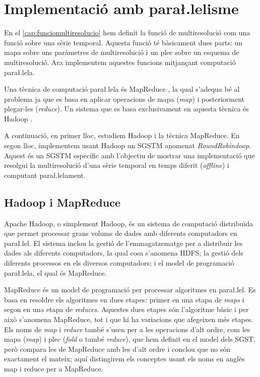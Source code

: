 \chapter{Implementació amb para\l.lelisme}
\label{sec:implementacio:mapreduce}



En el \autoref{cap:funciomultiresolucio} hem definit la funció de
multiresolució com una funció sobre una sèrie temporal. Aquesta funció
té bàsicament dues parts: un mapa sobre uns paràmetres de
multiresolució i un plec sobre un esquema de multiresolució. Ara
implementem aquestes funcions mitjançant computació para\l.lela.


Una tècnica de computació para\l.lela és
MapReduce \parencite{deanghemawat04:mapreduce}, la qual s'adequa bé al
problema ja que es basa en aplicar operacions de mapa (\emph{map}) i
posteriorment plegar-les (\emph{reduce}). Un sistema que es basa
exclusivament en aquesta tècnica és
Hadoop \parencite{hadoop}.

A continuació, en primer lloc, estudiem Hadoop i la tècnica MapReduce.
En segon lloc, implementem usant Hadoop un \gls{SGSTM} anomenat
\emph{RoundRobindoop}. Aquest és un \gls{SGSTM} específic amb
l'objectiu de mostrar una implementació que resolgui la multiresolució
d'una sèrie temporal en temps diferit (\emph{offline}) i computant
para\l.lelament.




\section{Hadoop i MapReduce}


Apache Hadoop, o simplement Hadoop, \parencite{hadoop} és un sistema
de computació distribuïda que permet processar grans volums de dades
amb diferents computadors en para\l.lel. El sistema inclou la gestió
de l'emmagatzematge per a distribuir les dades als diferents
computadors, la qual cosa s'anomena \gls{HDFS}; la gestió dels
diferents processos en els diversos computadors; i el model de
programació para\l.lela, el qual és MapReduce.


MapReduce \parencite{deanghemawat04:mapreduce,lammel08:mapreduce} és
un model de programació per processar algoritmes en para\l.lel. Es
basa en resoldre els algoritmes en dues etapes: primer en una etapa de
\emph{maps} i segon en una etapa de \emph{reduces}.  Aquestes dues
etapes són l'algoritme bàsic i per això s'anomena MapReduce, tot i que
hi ha variacions que afegeixen més etapes.  Els noms de \emph{map} i
\emph{reduce} també s'usen per a les operacions d'alt ordre, com les
mapa (\emph{map}) i plec (\emph{fold} o també \emph{reduce}), que hem
definit en el model dels \gls{SGST}, però
\textcite{lammel08:mapreduce} compara les de MapReduce amb les d'alt
ordre i conclou que no són exactament el mateix; aquí distingirem els
conceptes usant els noms en anglès map i reduce per a MapReduce.


